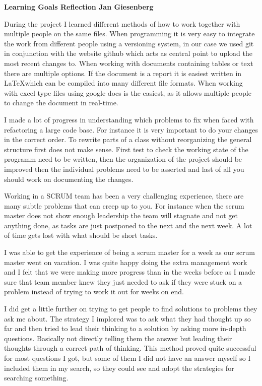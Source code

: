 \textbf{Learning Goals Reflection Jan Giesenberg}

During the project I learned different methods of how to work together with multiple people on the same files. When programming it is very easy to integrate the work from different people using a versioning system, in our case we used git in conjunction with the website github which acts as central point to upload the most recent changes to. When working with documents containing tables or text there are multiple options. If the document is a report it is easiest written in \LaTeX which can be compiled into many different file formats. When working with excel type files using google docs is the easiest, as it allows multiple people to change the document in real-time.

I made a lot of progress in understanding which problems to fix when faced with refactoring a large code base. For instance it is very important to do your changes in the correct order. To rewrite parts of a class without reorganizing the general structure first does not make sense. First test to check the working state of the programm need to be written, then the organization of the project should be improved then the individual problems need to be asserted and last of all you should work on documenting the changes.

Working in a SCRUM team has been a very challenging experience, there are many subtle problems that can creep up to you. For instance when the scrum master does not show enough leadership the team will stagnate and not get anything done, as tasks are just postponed to the next and the next week. A lot of time gets lost with what should be short tasks.

I was able to get the experience of being a scrum master for a week as our scrum master went on vacation. I was quite happy doing the extra management work and I felt that we were making more progress than in the weeks before as I made sure that team member knew they just needed to ask if they were stuck on a problem instead of trying to work it out for weeks on end.

I did get a little further on trying to get people to find solutions to problems they ask me about. The strategy I implored was to ask what they had thought up so far and then tried to lead their thinking to a solution by asking more in-depth questions. Basically not directly telling them the answer but leading their thoughts through a correct path of thinking. This method proved quite successful for most questions I got, but some of them I did not have an answer myself so I included them in my search, so they could see and adopt the strategies for searching something.
